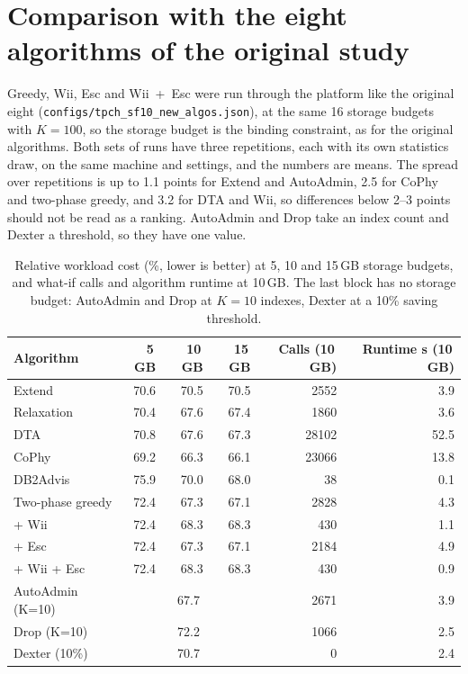 \documentclass[11pt,a4paper]{article}
\begin{document}
\section{Comparison with the eight algorithms of the original study}
Greedy, Wii, Esc and Wii~+~Esc were run through the platform like the original eight (\texttt{configs/tpch\_sf10\_new\_algos.json}), at the same 16 storage budgets with $K=100$, so the storage budget is the binding constraint, as for the original algorithms. Both sets of runs have three repetitions, each with its own statistics draw, on the same machine and settings, and the numbers are means. The spread over repetitions is up to 1.1 points for Extend and AutoAdmin, 2.5 for CoPhy and two-phase greedy, and 3.2 for DTA and Wii, so differences below 2--3 points should not be read as a ranking. AutoAdmin and Drop take an index count and Dexter a threshold, so they have one value.

\begin{table}[h]\centering\small
\begin{tabular}{lrrrrr}
\toprule
Algorithm & 5\,GB & 10\,GB & 15\,GB & Calls (10\,GB) & Runtime s (10\,GB)\\
\midrule
Extend & 70.6 & 70.5 & 70.5 & 2552 & 3.9\\
Relaxation & 70.4 & 67.6 & 67.4 & 1860 & 3.6\\
DTA & 70.8 & 67.6 & 67.3 & 28102 & 52.5\\
CoPhy & 69.2 & 66.3 & 66.1 & 23066 & 13.8\\
DB2Advis & 75.9 & 70.0 & 68.0 & 38 & 0.1\\
Two-phase greedy & 72.4 & 67.3 & 67.1 & 2828 & 4.3\\
\quad + Wii & 72.4 & 68.3 & 68.3 & 430 & 1.1\\
\quad + Esc & 72.4 & 67.3 & 67.1 & 2184 & 4.9\\
\quad + Wii + Esc & 72.4 & 68.3 & 68.3 & 430 & 0.9\\
\midrule
AutoAdmin (K=10) & \multicolumn{3}{c}{67.7} & 2671 & 3.9\\
Drop (K=10) & \multicolumn{3}{c}{72.2} & 1066 & 2.5\\
Dexter (10\%) & \multicolumn{3}{c}{70.7} & 0 & 2.4\\
\bottomrule
\end{tabular}
\caption{Relative workload cost (\%, lower is better) at 5, 10 and 15\,GB storage budgets, and what-if calls and algorithm runtime at 10\,GB. The last block has no storage budget: AutoAdmin and Drop at $K=10$ indexes, Dexter at a 10\% saving threshold.}\label{tab:compare}
\end{table}
\end{document}

